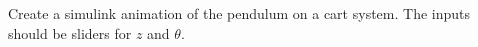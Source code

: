 Create a simulink animation of the pendulum on a cart system. The inputs should be sliders for $z$ and $\theta$.
